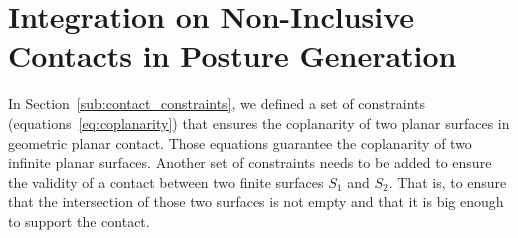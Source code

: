 

\section{Integration on Non-Inclusive Contacts in Posture Generation}


In Section~\ref{sub:contact_constraints}, we defined a set of constraints (equations~\ref{eq:coplanarity}) that ensures the coplanarity of two planar surfaces in geometric planar contact.
Those equations guarantee the coplanarity of two infinite planar surfaces.
Another set of constraints needs to be added to ensure the validity of a contact between two finite surfaces $S_1$ and $S_2$.
That is, to ensure that the intersection of those two surfaces is not empty and that it is big enough to support the contact.

